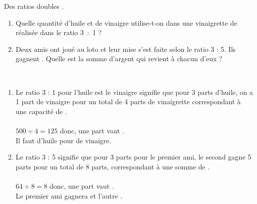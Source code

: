 \begin{exercice*}
   Des ratios \og doubles \fg.
      \begin{enumerate}
         \item Quelle quantité d'huile et de vinaigre utilise-t-on dans une vinaigrette de  réalisée dans le ratio 3~:~1 ?
         \item Deux amis ont joué au loto et leur mise s'est faite selon le ratio 3 : 5. Ils gagnent . Quelle est la somme d'argent qui revient à chacun d'eux ?
   \end{enumerate}
\end{exercice*}
\begin{corrige}
\ \\ [-5mm]
   \begin{enumerate}
      \item Le ratio 3 : 1 pour l'huile est le vinaigre signifie que pour 3 parts d'huile, on a 1 part de vinaigre pour un total de 4 parts de vinaigrette correspondant à une capacité de . \\ [2mm]
            \qquad {} \\
         $500\div4 =125$ donc, une part vaut . \\
         Il faut {\color{red}  d'huile pour  de vinaigre.}        
      \item Le ratio 3 : 5 signifie que pour 3 parts pour le premier ami, le second gagne 5 parts pour un total de 8 parts, correspondant à une somme de . \\ [2mm]
            \qquad {} \\
            $64\div8 =8$ donc, une part vaut . \\
            {\color{red} Le premier ami gagnera  et l'autre .}
   \end{enumerate}
\end{corrige}
